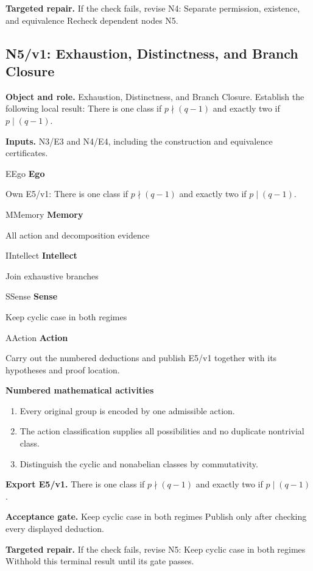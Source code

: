 \documentclass[preprint,12pt,aps,pra,showkeys,amsmath,amssymb,superscriptaddress,floatfix]{revtex4-2}
\theoremstyle{definition}
\theoremstyle{remark}
\newcommand{\mmfaculty}[3]{%
 \begin{mmfacultybox}{#1}{#2}
 {\sffamily\bfseries\color{MMBlue}#2}\par\smallskip #3
 \end{mmfacultybox}}
\newcommand{\field}[2]{\par\smallskip\noindent\textbf{#1.} #2\par}
\begin{document}
\field{Targeted repair}{If the check fails, revise N4: Separate permission, existence, and
equivalence Recheck dependent nodes N5.}

\clearpage

\subsection{N5/v1: Exhaustion, Distinctness, and Branch Closure}

\field{Object and role}{Exhaustion, Distinctness, and Branch Closure. Establish the following
local result: There is one class if \(p\nmid(q-1)\) and exactly two if
\(p\mid(q-1)\).}

\field{Inputs}{N3/E3 and N4/E4, including the construction and equivalence
certificates.}

\mmfaculty{E}{Ego}{Own E5/v1: There is one class if \(p\nmid(q-1)\) and exactly two if
\(p\mid(q-1)\).}

\mmfaculty{M}{Memory}{All action and decomposition evidence}

\mmfaculty{I}{Intellect}{Join exhaustive branches}

\mmfaculty{S}{Sense}{Keep cyclic case in both regimes}

\mmfaculty{A}{Action}{Carry out the numbered deductions and publish E5/v1 together with its
hypotheses and proof location.}

\smallskip\noindent\textbf{Numbered mathematical activities}

\begin{enumerate}[label=N5.\arabic*,leftmargin=3.4em]

\item Every original group is encoded by one admissible action.

\item The action classification supplies all possibilities and no duplicate
nontrivial class.

\item Distinguish the cyclic and nonabelian classes by commutativity.

\end{enumerate}

\field{Export E5/v1}{There is one class if \(p\nmid(q-1)\) and exactly two if \(p\mid(q-1)\).}

\field{Acceptance gate}{Keep cyclic case in both regimes Publish only after checking every
displayed deduction.}

\field{Targeted repair}{If the check fails, revise N5: Keep cyclic case in both regimes Withhold
this terminal result until its gate passes.}
\end{document}
